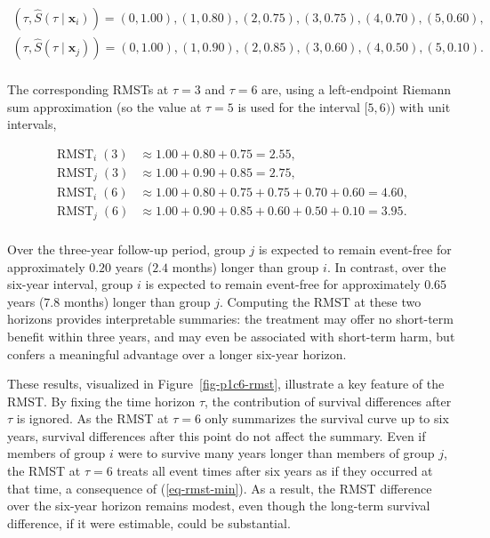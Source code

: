 \documentclass[
  letterpaper,
  krantz2]{style/krantz}
\begin{document}
\[
\begin{aligned}
(\tau, \hat{S}(\tau \mid \mathbf{x}_i)) = (0, 1.00), (1, 0.80), (2, 0.75), (3, 0.75), (4, 0.70), (5, 0.60), \\
(\tau, \hat{S}(\tau \mid \mathbf{x}_j)) = (0, 1.00), (1, 0.90), (2, 0.85), (3, 0.60), (4, 0.50), (5, 0.10). \\
\end{aligned}
\]

The corresponding RMSTs at \(\tau=3\) and \(\tau=6\) are, using a
left-endpoint Riemann sum approximation (so the value at \(\tau=5\) is
used for the interval \([5,6)\)) with unit intervals,

\[
\begin{aligned}
\operatorname{RMST}_i(3) &\approx 1.00 + 0.80 + 0.75 = 2.55, \\
\operatorname{RMST}_j(3) &\approx 1.00 + 0.90 + 0.85 = 2.75, \\
\operatorname{RMST}_i(6) &\approx 1.00 + 0.80 + 0.75 + 0.75 + 0.70 + 0.60 = 4.60, \\
\operatorname{RMST}_j(6) &\approx 1.00 + 0.90 + 0.85 + 0.60 + 0.50 + 0.10 = 3.95. \\
\end{aligned}
\]

Over the three-year follow-up period, group \(j\) is expected to remain
event-free for approximately \(0.20\) years (\(2.4\) months) longer than
group \(i\). In contrast, over the six-year interval, group \(i\) is
expected to remain event-free for approximately \(0.65\) years (\(7.8\)
months) longer than group \(j\). Computing the RMST at these two
horizons provides interpretable summaries: the treatment may offer no
short-term benefit within three years, and may even be associated with
short-term harm, but confers a meaningful advantage over a longer
six-year horizon.

These results, visualized in Figure~\ref{fig-p1c6-rmst}, illustrate a
key feature of the RMST. By fixing the time horizon \(\tau\), the
contribution of survival differences after \(\tau\) is ignored. As the
RMST at \(\tau=6\) only summarizes the survival curve up to six years,
survival differences after this point do not affect the summary. Even if
members of group \(i\) were to survive many years longer than members of
group \(j\), the RMST at \(\tau=6\) treats all event times after six
years as if they occurred at that time, a consequence of
(\ref{eq-rmst-min}). As a result, the RMST difference over the six-year
horizon remains modest, even though the long-term survival difference,
if it were estimable, could be substantial.
\end{document}
